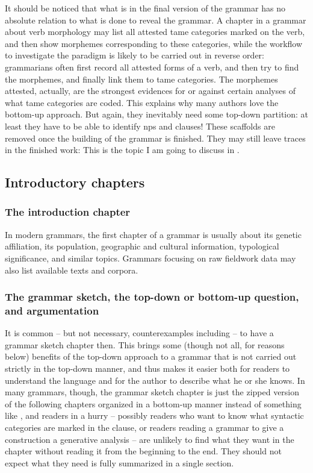 \documentclass[UTF8, a4paper, oneside, scheme=plain]{ctexart}
\begin{document}
It should be noticed that what is in the final version of the grammar 
has no absolute relation to what is done to reveal the grammar.
A chapter in a grammar about verb morphology 
may list all attested \ac{tame} categories marked on the verb,
and then show morphemes corresponding to these categories,
while the workflow to investigate the paradigm 
is likely to be carried out in reverse order:
grammarians often first record all attested forms of a verb,
and then try to find the morphemes,
and finally link them to \ac{tame} categories.
The morphemes attested, actually, 
are the strongest evidences for or against certain analyses of 
what \ac{tame} categories are coded.
This explains why many authors love the bottom-up approach.
But again, they inevitably need some top-down partition:
at least they have to be able to identify \ac{np}s and clauses!
These scaffolds are removed once the building of the grammar is finished.
They may still leave traces in the finished work:
This is the topic I am going to discuss in .

\subsection{Introductory chapters}

\subsubsection{The introduction chapter}\label{sec:introduction-chapter}

In modern grammars, the first chapter of a grammar is usually about 
its genetic affiliation, its population, 
geographic and cultural information,
typological significance, and similar topics.
Grammars focusing on raw fieldwork data 
may also list available texts and corpora.

\subsubsection{The grammar sketch, the top-down or bottom-up question, and argumentation}\label{sec:grammar-sketch}

It is common -- but not necessary, counterexamples including \citet{Grimm2021} 
-- to have a grammar sketch chapter then.
This brings some (though not all, for reasons below) benefits of the top-down approach
to a grammar that is not carried out strictly in the top-down manner,
and thus makes it easier both for readers to understand the language 
and for the author to describe what he or she knows.
In many grammars, though, the grammar sketch chapter is just 
the zipped version of the following chapters organized in a bottom-up manner
instead of something like ,
and readers in a hurry 
-- possibly readers who want to know what syntactic categories are marked in the clause,
or readers reading a grammar to give a construction a generative analysis  --
are unlikely to find what they want in the chapter without reading it from the beginning to the end.
They should not expect what they need is fully summarized in a single section.
\end{document}
